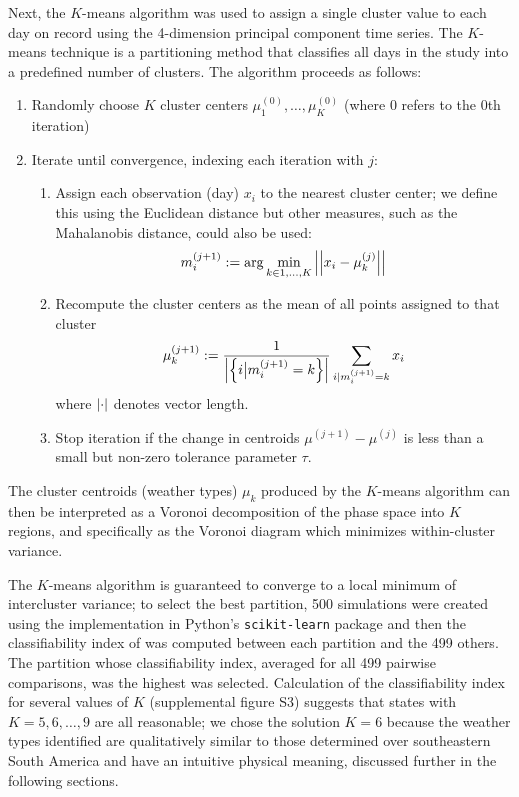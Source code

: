 \documentclass{ametsoc}
\begin{document}
Next, the $K$-means algorithm was used to assign a single cluster value to each day on record using the 4-dimension principal component time series.
The $K$-means technique is a partitioning method that classifies all days in the study into a predefined number of clusters.
The algorithm proceeds as follows:
\begin{enumerate}
	\item Randomly choose $K$ cluster centers $\mu_1^{(0)}, \ldots, \mu_K^{(0)}$ (where $0$ refers to the $0$th iteration)
	\item Iterate until convergence, indexing each iteration with $j$:
	\begin{enumerate}
		\item Assign each observation (day) $x_i$ to the nearest cluster center; we define this using the Euclidean distance but other measures, such as the Mahalanobis distance, could also be used:
		\begin{equation}
			m_i^{(j+1)} := \arg\min_{k\in 1,\ldots,K} \abs{\abs{x_i - \mu_k^{(j)}}}
		\end{equation}
		\item Recompute the cluster centers as the mean of all points assigned to that cluster
		\begin{equation}
			\mu_k^{(j+1)} := \frac{1}{\abs{\qty{i \big| m_i^{(j+1)}=k}}} \sum_{i | m_i^{(j+1)}=k} x_i
		\end{equation}
		where $\abs{\cdot}$ denotes vector length.
		\item Stop iteration if the change in centroids $\mu^{(j+1)} - \mu^{(j)}$ is less than a small but non-zero tolerance parameter $\tau$.
	\end{enumerate}
\end{enumerate}
The cluster centroids (weather types) $\mu_k$ produced by the $K$-means algorithm can then be interpreted as a Voronoi decomposition of the phase space into $K$ regions, and specifically as the Voronoi diagram which minimizes within-cluster variance.

The $K$-means algorithm is guaranteed to converge to a local minimum of intercluster variance; to select the best partition, 500 simulations were created using the implementation in Python's \texttt{scikit-learn} package \citep{Pedregosa:2012tv} and then the classifiability index of \citet{Michelangeli1995} was computed between each partition and the 499 others.
The partition whose classifiability index, averaged for all 499 pairwise comparisons, was the highest was selected.
Calculation of the classifiability index for several values of $K$ (supplemental figure S3) suggests that states with $K=5,6,\ldots,9$ are all reasonable; we chose the solution $K=6$ because the weather types identified are qualitatively similar to those determined over southeastern South America \citep{Munoz2015,Munoz2016} and have an intuitive physical meaning, discussed further in the following sections.
\end{document}
